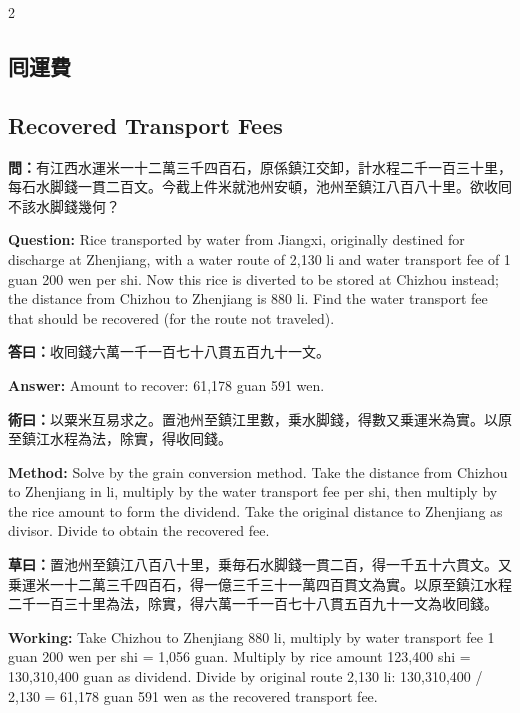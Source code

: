 \documentclass[11pt,a4paper]{article}
\newcommand{\QuestionText}[1]{\par\noindent\textbf{\color{problemcolor}問：}#1\par}
\newcommand{\AnswerText}[1]{\par\noindent\textbf{\color{answercolor}答曰：}#1\par}
\newcommand{\MethodText}[1]{\par\noindent\textbf{\color{methodcolor}術曰：}#1\par}
\newcommand{\WorkingText}[1]{\par\noindent\textbf{草曰：}#1\par}
\newcommand{\QuestionEn}[1]{\par\noindent\textbf{\color{problemcolor}Question:} #1\par}
\newcommand{\AnswerEn}[1]{\par\noindent\textbf{\color{answercolor}Answer:} #1\par}
\newcommand{\MethodEn}[1]{\par\noindent\textbf{\color{methodcolor}Method:} #1\par}
\newcommand{\WorkingEn}[1]{\par\noindent\textbf{Working:} #1\par}
\begin{document}
\begin{paracol}{2}

\subsection*{\color{sectioncolor}囘運費}
\switchcolumn
\subsection*{\color{sectioncolor}Recovered Transport Fees}
\switchcolumn*

\QuestionText{有江西水運米一十二萬三千四百石，原係鎮江交卸，計水程二千一百三十里，每石水脚錢一貫二百文。今截上件米就池州安頓，池州至鎮江八百八十里。欲收囘不該水脚錢幾何？}
\switchcolumn
\QuestionEn{Rice transported by water from Jiangxi, originally destined for discharge at Zhenjiang, with a water route of 2,130 li and water transport fee of 1 guan 200 wen per shi. Now this rice is diverted to be stored at Chizhou instead; the distance from Chizhou to Zhenjiang is 880 li. Find the water transport fee that should be recovered (for the route not traveled).}
\switchcolumn*

\AnswerText{收囘錢六萬一千一百七十八貫五百九十一文。}
\switchcolumn
\AnswerEn{Amount to recover: 61,178 guan 591 wen.}
\switchcolumn*

\MethodText{以粟米互易求之。置池州至鎮江里數，乗水脚錢，得數又乗運米為實。以原至鎮江水程為法，除實，得收囘錢。}
\switchcolumn
\MethodEn{Solve by the grain conversion method. Take the distance from Chizhou to Zhenjiang in li, multiply by the water transport fee per shi, then multiply by the rice amount to form the dividend. Take the original distance to Zhenjiang as divisor. Divide to obtain the recovered fee.}
\switchcolumn*

\WorkingText{置池州至鎮江八百八十里，乗毎石水脚錢一貫二百，得一千五十六貫文。又乗運米一十二萬三千四百石，得一億三千三十一萬四百貫文為實。以原至鎮江水程二千一百三十里為法，除實，得六萬一千一百七十八貫五百九十一文為收囘錢。}
\switchcolumn
\WorkingEn{Take Chizhou to Zhenjiang 880 li, multiply by water transport fee 1 guan 200 wen per shi = 1,056 guan. Multiply by rice amount 123,400 shi = 130,310,400 guan as dividend. Divide by original route 2,130 li: 130,310,400 / 2,130 = 61,178 guan 591 wen as the recovered transport fee.}
\switchcolumn*


\end{paracol}
\end{document}
